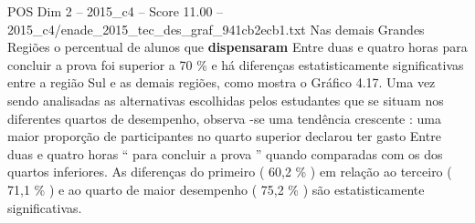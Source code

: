 \begin{textsample}{POS Dim 2 – 2015\_c4 – Score 11.00 – 2015\_c4/enade\_2015\_tec\_des\_graf\_941cb2ecb1.txt}
Nas demais Grandes Regiões o percentual de alunos que \textbf{dispensaram} Entre duas e quatro horas para concluir a prova foi superior a 70 \% e há diferenças estatisticamente significativas entre a região Sul e as demais regiões, como mostra o Gráfico 4.17.
Uma vez sendo analisadas as alternativas escolhidas pelos estudantes que se situam nos diferentes quartos de desempenho, observa -se uma tendência crescente : uma maior proporção de participantes no quarto superior declarou ter gasto Entre duas e quatro horas “ para concluir a prova ” quando comparadas com os dos quartos inferiores.
As diferenças do primeiro ( 60,2 \% ) em relação ao terceiro ( 71,1 \% ) e ao quarto de maior desempenho ( 75,2 \% ) são estatisticamente significativas.

\end{textsample}
